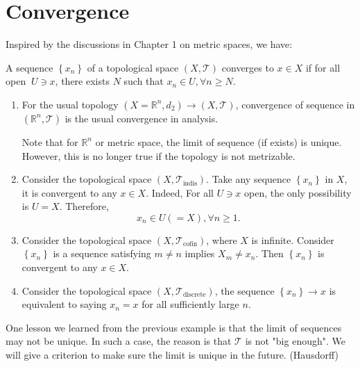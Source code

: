\section{Convergence}
Inspired by the discussions in Chapter 1 on metric spaces, we have:
\begin{definition}[Convergence] A sequence \(\left\{  x_n\right\}\) of a topological space $(X, \mathcal{T})$ converges to \(x \in  X\) if for all open \(\ U \ni  x\), there exists \(N\) such that \(x_n \in  U,\forall n \geq  N\).
\end{definition}

\begin{example} \begin{enumerate}
    \item For the usual topology \(\left({X = {\mathbb{R}}^{n},{d}_{2}}\right)  \rightarrow  \left({X,\mathcal{T}}\right)\), convergence of sequence in \(\left({{\mathbb{R}}^{n},\mathcal{T}}\right)\) is the usual convergence in analysis.
    
    Note that for \({\mathbb{R}}^{n}\) or metric space, the limit of sequence (if exists) is unique. However, this is no longer true if the topology is not metrizable.

\item Consider the topological space \(\left({X,{\mathcal{T}}_{\text{indis}}}\right)\). Take any sequence \(\left\{  x_n\right\}\) in \(X\), it is convergent to any \(x \in  X\). Indeed, For all \(U \ni  x\) open, the only possibility is \(U = X\). Therefore,
\[
x_n \in  U\left({ = X}\right),\forall n \geq  1\text{.}
\]

\item Consider the topological space \(\left({X,{\mathcal{T}}_{\text{cofin}}}\right)\), where \(X\) is infinite. Consider \(\left\{  x_n\right\}\) is a sequence satisfying \(m \neq  n\) implies \(X_{m} \neq  x_n\). Then \(\left\{  x_n\right\}\) is convergent to any \(x \in  X\). 

\item Consider the topological space \(\left({X,{\mathcal{T}}_{\text{discrete}}}\right)\), the sequence \(\left\{  x_n\right\}   \rightarrow  x\) is equivalent to saying \(x_n = x\) for all sufficiently large \(n\).
\end{enumerate}
\end{example}

One lesson we learned from the previous example is that the limit of sequences may not be unique. In such a case, the reason is that \(\mathcal{T}\) is not "big enough". We will give a criterion to make sure the limit is unique in the future. (Hausdorff)

